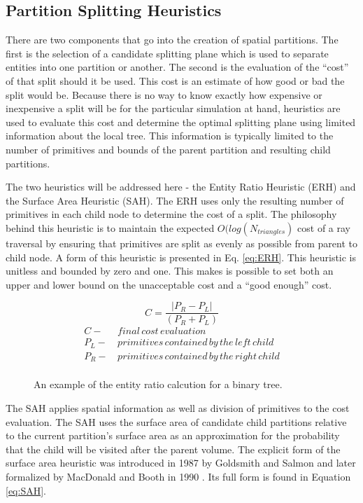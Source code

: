 \subsection{Partition Splitting Heuristics}

There are two components that go into the creation of spatial
partitions. The first is the selection of a candidate splitting plane which is
used to separate entities into one partition or another. The second is
the evaluation of the ``cost'' of that split should it be used. This cost is an
estimate of how good or bad the split would be. Because there is no way to know
exactly how expensive or inexpensive a split will be for the particular
simulation at hand, heuristics are used to evaluate this cost and determine the
optimal splitting plane using limited information about the local tree. This
information is typically limited to the number of primitives and bounds of the
parent partition and resulting child partitions.

The two heuristics will be addressed here - the Entity Ratio Heuristic (ERH) and the
Surface Area Heuristic (SAH). The ERH uses only the resulting number of
primitives in each child node to determine the cost of a split. The philosophy
behind this heuristic is to maintain the expected $O(log(N_{triangles})$ cost of
a ray traversal by ensuring that primitives are split as evenly as possible from
parent to child node. A form of this heuristic is presented in
Eq. \ref{eq:ERH}. This heuristic is unitless and bounded by zero and
one. This makes is possible to set both an upper and lower bound on the
unacceptable cost and a ``good enough'' cost.

\begin{figure}[H]
\begin{equation}
\label{eq:ERH}
 C = \frac{|P_{R}-P_{L}|}{(P_{R} + P_{L})} 
\end{equation}
  \begin{align*}
    C - & \,final \, cost \, evaluation \\
    P_{L} - & \, primitives\, contained\, by\, the\, left\, child  \\
    P_{R} - & \, primitives\, contained\, by\, the\, right\, child \\
  \end{align*}
  \caption{An example of the entity ratio calcution for a binary tree.}
  \label{fig:ERH}
\end{figure}

The SAH applies spatial information as well as division of primitives to the
cost evaluation. The SAH uses the surface area of candidate child partitions
relative to the current partition's surface area as an approximation for the
probability that the child will be visited after the parent volume. The explicit
form of the surface area heuristic was introduced in 1987 by Goldsmith and
Salmon \cite{Goldsmith_1987} and later formalized by MacDonald and Booth in 1990
\cite{MacDonald_1990}. Its full form is found in Equation \ref{eq:SAH}.

